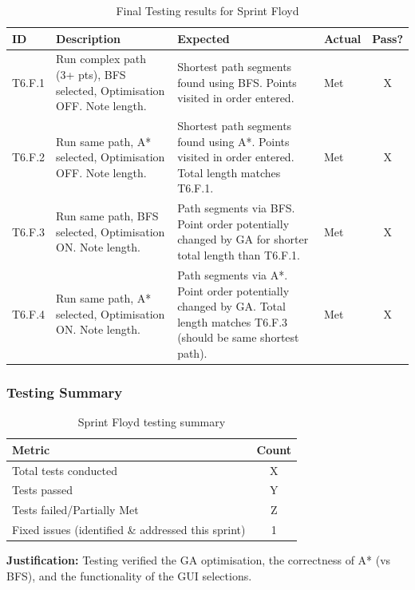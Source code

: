 \begin{table}[htbp] %
	\centering
	\begin{tabularx}{\textwidth}{|l|X|p{5.5cm}|p{2.5cm}|c|}
		\hline
		\textbf{ID} & \textbf{Description} & \textbf{Expected} & \textbf{Actual} & \textbf{Pass?} \\
		\hline
		T6.F.1 & Run complex path (3+ pts), BFS selected, Optimisation OFF. Note length. & Shortest path segments found using BFS. Points visited in order entered. & Met & X \\
		\hline
		T6.F.2 & Run same path, A* selected, Optimisation OFF. Note length. & Shortest path segments found using A*. Points visited in order entered. Total length matches T6.F.1. & Met & X \\
		\hline
		T6.F.3 & Run same path, BFS selected, Optimisation ON. Note length. & Path segments via BFS. Point order potentially changed by GA for shorter total length than T6.F.1. & Met & X \\
		\hline
		T6.F.4 & Run same path, A* selected, Optimisation ON. Note length. & Path segments via A*. Point order potentially changed by GA. Total length matches T6.F.3 (should be same shortest path). & Met & X \\
		\hline
	\end{tabularx}
	\caption{Final Testing results for Sprint Floyd}
\end{table}

\subsubsection{Testing Summary}

\begin{table}[htbp]
	\centering
	\begin{tabular}{|l|c|}
		\hline
		\textbf{Metric} & \textbf{Count} \\
		\hline
		Total tests conducted & X \\ %
		\hline
		Tests passed & Y \\
		\hline
		Tests failed/Partially Met & Z \\
		\hline
		Fixed issues (identified \& addressed this sprint) & 1 \\ %
		\hline
	\end{tabular}
	\caption{Sprint Floyd testing summary}
\end{table}
\textbf{Justification:} Testing verified the GA optimisation, the correctness of A* (vs BFS), and the functionality of the GUI selections.

